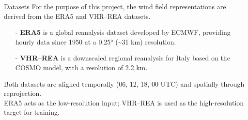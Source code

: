 \documentclass[footline=authortitle]{beamer}
\begin{document}

\begin{frame}{Datasets}
    For the purpose of this project, the wind field representations are derived from the ERA5 and VHR--REA datasets.
    \vspace{1em}
        \begin{itemize}
        \justifying
            \item[-] \textbf{ERA5} is a global reanalysis dataset developed by ECMWF, providing hourly data since 1950 at a 0.25° (\textasciitilde31 km) resolution.
            \item[-] \textbf{VHR--REA} is a downscaled regional reanalysis for Italy based on the COSMO model, with a resolution of 2.2 km.
        \end{itemize}
    \vspace{1em}
    Both datasets are aligned temporally (06, 12, 18, 00 UTC) and spatially through reprojection. \\
    \vspace{1em}
    ERA5 acts as the low-resolution input; VHR--REA is used as the high-resolution target for training.
\end{frame}
\end{document}
